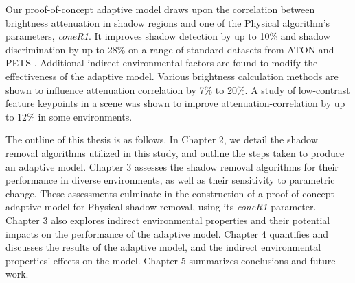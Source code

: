 Our proof-of-concept adaptive model draws upon the correlation between brightness attenuation in shadow regions and one of the Physical algorithm's parameters, \textit{coneR1}. It improves shadow detection by up to 10\% and shadow discrimination by up to 28\% on a range of standard datasets from ATON and PETS \cite{aton2002, pets2001}. Additional indirect environmental factors are found to modify the effectiveness of the adaptive model. Various brightness calculation methods are shown to influence attenuation correlation by 7\% to 20\%.
A study of low-contrast feature keypoints in a scene was shown to improve attenuation-correlation by up to 12\% in some environments.

The outline of this thesis is as follows. In Chapter 2, we detail the shadow removal algorithms utilized in this study, and outline the steps taken to produce an adaptive model. Chapter 3 assesses the shadow removal algorithms for their performance in diverse environments, as well as their sensitivity to parametric change. These assessments culminate in the construction of a proof-of-concept adaptive model for Physical shadow removal, using its \textit{coneR1} parameter. Chapter 3 also explores indirect environmental properties and their potential impacts on the performance of the adaptive model. Chapter 4 quantifies and discusses the results of the adaptive model, and the indirect environmental properties' effects on the model. Chapter 5 summarizes conclusions and future work.


